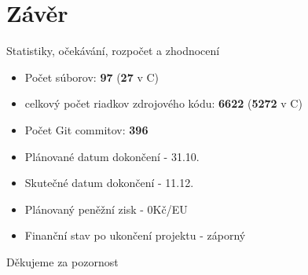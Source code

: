 \documentclass[13pt]{beamer}
\begin{document}

\section{Závěr}

\begin{frame}{Statistiky, očekávání, rozpočet a zhodnocení}
\begin{itemize}
\item Počet súborov: \textbf{97} (\textbf{27} v C)
\item celkový počet riadkov zdrojového kódu: \textbf{6622} (\textbf{5272} v C)
\item Počet Git commitov: \textbf{396}
\end{itemize}

\begin{itemize}
\item Plánované datum dokončení - 31.10.
\item Skutečné datum dokončení - 11.12.
\item Plánovaný peněžní zisk - 0Kč/EU
\item Finanční stav po ukončení projektu - záporný
\end{itemize}
Děkujeme za pozornost
\end{frame}
\end{document}
